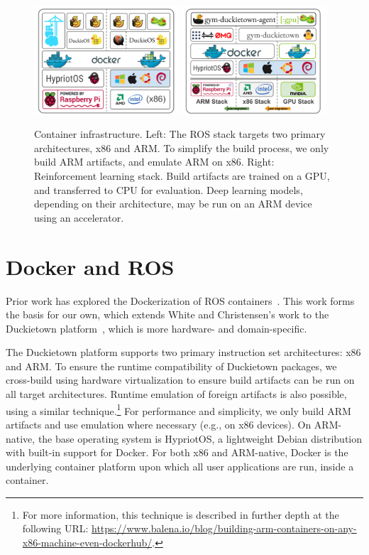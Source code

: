 \documentclass[12pt,initial,twoside,maitrise]{dms}
\numberwithin{equation}{section}
\numberwithin{table}{chapter}
\numberwithin{figure}{chapter}
\begin{document}
\begin{figure}[ht]
    \centering
    \includegraphics[width=0.48\textwidth]{docker_stack_1.png}
    \includegraphics[width=0.48\textwidth]{docker_stack_2.png}
    \caption{Container infrastructure. Left: The ROS stack targets two primary architectures, x86 and ARM. To simplify the build process, we only build ARM artifacts, and emulate ARM on x86. Right: Reinforcement learning stack. Build artifacts are trained on a GPU, and transferred to CPU for evaluation. Deep learning models, depending on their architecture, may be run on an ARM device using an accelerator.}
    \label{fig:docker}
\end{figure}

\section{Docker and ROS}

Prior work has explored the Dockerization of ROS containers~\citep{white2017ros-docker}. This work forms the basis for our own, which extends White and Christensen's work to the Duckietown platform~\citep{paull2017duckietown}, which is more hardware- and domain-specific.

The Duckietown platform supports two primary instruction set architectures: x86 and ARM. To ensure the runtime compatibility of Duckietown packages, we cross-build using hardware virtualization to ensure build artifacts can be run on all target architectures. Runtime emulation of foreign artifacts is also possible, using a similar technique.\footnote{For more information, this technique is described in further depth at the following URL: \url{https://www.balena.io/blog/building-arm-containers-on-any-x86-machine-even-dockerhub/}.} For performance and simplicity, we only build ARM artifacts and use emulation where necessary (e.g., on x86 devices). On ARM-native, the base operating system is HypriotOS, a lightweight Debian distribution with built-in support for Docker. For both x86 and ARM-native, Docker is the underlying container platform upon which all user applications are run, inside a container.
\end{document}
